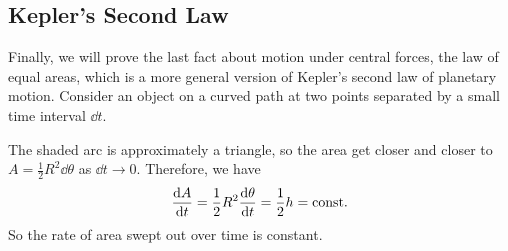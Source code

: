 \documentclass[../classical_mechanics.tex]{subfiles}
\begin{document}
        \subsection{Kepler's Second Law}\label{subsec:keplers-second-law}
            Finally, we will prove the last fact about motion under central forces, the law of equal areas, which is a more general version of Kepler's second law of planetary motion.
            Consider an object on a curved path at two points separated by a small time interval $\dd{t}$.
            \begin{figure}[H]
                \centering
            \end{figure}
            The shaded arc is approximately a triangle, so the area get closer and closer to $A=\frac{1}{2}R^2\dd{\theta}$ as $\dd{t}\to0$.
            Therefore, we have
            \begin{equation}
                \dv{A}{t}=\frac{1}{2}R^2\dv{\theta}{t}=\frac{1}{2}h=\text{const}.
            \end{equation}
            So the rate of area swept out over time is constant.
\end{document}
